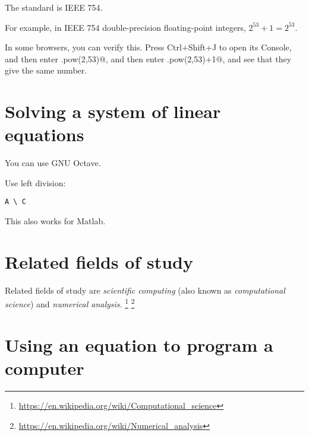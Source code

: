 The standard is IEEE 754.

For example, in IEEE 754 double-precision floating-point integers,
\( 2^{53} + 1 = 2^{53} \).

In some browsers, you can verify this. Press Ctrl+Shift+J to open its Console,
and then enter \verb@Math.pow(2,53)@, and then enter \verb@Math.pow(2,53)+1@,
and see that they give the same number.

\section{Solving a system of linear equations}

You can use GNU Octave.

Use left division:
\begin{verbatim}
A \ C
\end{verbatim}

This also works for Matlab.

\section{Related fields of study}

Related fields of study are
\emph{scientific computing} (also known as \emph{computational science})
and \emph{numerical analysis}.%
\footnote{\url{https://en.wikipedia.org/wiki/Computational_science}}%
\footnote{\url{https://en.wikipedia.org/wiki/Numerical_analysis}}

\section{Using an equation to program a computer}

